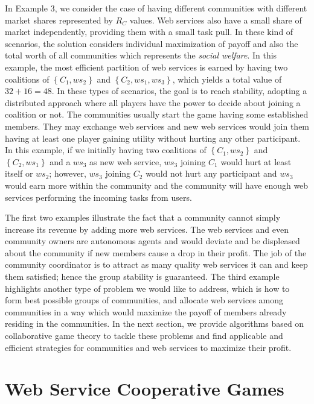 \documentclass[10pt,journal,cspaper,compsoc]{IEEEtran}
\begin{document}
In Example 3, we consider the case of having different communities
with different market shares represented by ${R_C}$ values. Web
services also have a small share of market independently,
providing them with a small task pull. In these kind of scenarios,
the solution considers individual maximization of payoff and also
the total worth of all communities which represents the
\emph{social welfare}. In this example, the most efficient
partition of web services is earned by having two coalitions of
$\left\{C_{1}, ws_2\right\}$ and $\left\{C_{2},
ws_1, ws_3\right\}$, which yields a total value of $32 + 16 = 48$.
In these types of scenarios, the goal is to reach stability,
adopting a distributed approach where all players have the power
to decide about joining a coalition or not. The communities
usually start the game having some established members. They may
exchange web services and new web services would join them having
at least one player gaining utility without hurting any other
participant. In this example, if we initially having two
coalitions of $\left\{C_{1}, ws_2\right\}$ and
$\left\{C_{2}, ws_1\right\}$ and a ${ws_3}$ as new web
service, ${ws_3}$ joining ${C_{1}}$ would hurt at least
itself or $ws_2$; however, ${ws_3}$ joining ${C_{2}}$ would
not hurt any participant and ${ws_3}$ would earn more within the
community and the community will have enough web services
performing the incoming tasks from users.

The first two examples illustrate the fact that a community cannot
simply increase its revenue by adding more web services. The web
services and even community owners are autonomous agents and would
deviate and be displeased about the community if new members cause
a drop in their profit. The job of the community coordinator is to
attract as many quality web services it can and keep them
satisfied; hence the group stability is guaranteed. The third
example highlights another type of problem we would like to
address, which is how to form best possible groups of communities,
and allocate web services among communities in a way which would
maximize the payoff of members already residing in the
communities. In the next section, we provide algorithms based on
collaborative game theory to tackle these problems and find
applicable and efficient strategies for communities and web
services to maximize their profit.


\section{Web Service Cooperative Games}\label{s:game_solution}
\end{document}
